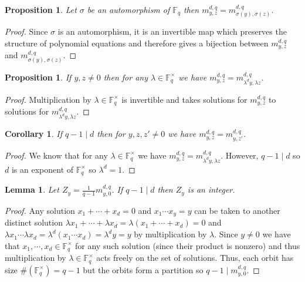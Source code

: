 \documentclass{article}
\newcommand{\finfield}[1]{\mathbb{F}_{#1}}
\newcommand{\finunits}[1]{\mathbb{F}_{#1}^\times}
\newcommand{\divides}{\mid}
\newtheorem{corollary}{Corollary}[theorem]
\newtheorem{lemma}[theorem]{Lemma}
\newtheorem{proposition}[theorem]{Proposition}
\theoremstyle{definition}
\theoremstyle{definition}
\theoremstyle{remark}
\begin{document}
\begin{proposition}
Let $\sigma$ be an automorphism of $\finfield{q}$ then $m^{d,q}_{y,z} = m^{d,q}_{\sigma(y), \sigma(z)}$.
\end{proposition}

\begin{proof}
Since $\sigma$ is an automorphism, it is an invertible map which preserves the structure of polynomial equations and therefore gives a bijection between $m^{d,q}_{y,z}$ and $m^{d,q}_{\sigma(y), \sigma(z)}$.
\end{proof}

\begin{proposition}
If $y,z \neq 0$ then for any $\lambda \in \finunits{q}$ we have $m^{d,q}_{y,z} = m^{d,q}_{\lambda^d y, \lambda z}$. 
\end{proposition}


\begin{proof}
Multiplication by $\lambda \in \finunits{q}$ is invertible and takes solutions for $m^{d,q}_{y,z}$ to solutions for $m^{d,q}_{\lambda^d y, \lambda z}$.
\end{proof}

\begin{corollary} \label{cor:equal_for_all_z}
If $q - 1 \divides d$ then for $y, z, z' \neq 0$ we have $m^{d,q}_{y,z} = m^{d,q}_{y,z'}$. 
\end{corollary}

\begin{proof}
We know that for any $\lambda \in \finunits{q}$ we have $m^{d,q}_{y,z} = m^{d,q}_{\lambda^d y, \lambda z}$. However, $q-1 \divides d$ so $d$ is an exponent of $\finunits{q}$ so $\lambda^{d} = 1$. 
\end{proof}

\begin{lemma}
Let $Z_y = \frac{1}{q-1} m^{d,q}_{y,0}$. If $q-1 \divides d$ then $Z_y$ is an integer.
\end{lemma}

\begin{proof}
Any solution $x_1 + \cdots + x_d = 0$ and $x_1 \cdots x_y = y$ can be taken to another distinct solution $\lambda x_1 + \cdots + \lambda x_d = \lambda (x_1 + \cdots + x_d) = 0$ and $\lambda x_1 \cdots \lambda x_d = \lambda^d (x_1 \cdots x_d) = \lambda^d y = y$ by multiplication by $\lambda$. Since $y \neq 0$ we have that $x_1, \cdots, x_d \in \finunits{q}$ for any such solution (since their product is nonzero) and thus multiplication by $\lambda \in \finunits{q}$ acts freely on the set of solutions. Thus, each orbit has size $\#(\finunits{q}) = q - 1$ but the orbits form a partition so $q - 1 \divides m^{d,q}_{y, 0}$. 
\end{proof}
\end{document}
